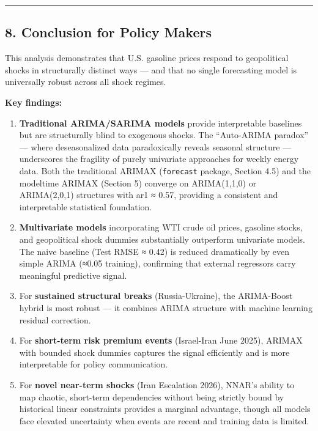 \documentclass[
]{article}
\begin{document}
\begin{center}\rule{0.5\linewidth}{0.5pt}\end{center}

\subsection{8. Conclusion for Policy
Makers}\label{conclusion-for-policy-makers}

This analysis demonstrates that U.S. gasoline prices respond to
geopolitical shocks in structurally distinct ways --- and that no single
forecasting model is universally robust across all shock regimes.

\textbf{Key findings:}

\begin{enumerate}
\def\labelenumi{\arabic{enumi}.}
\item
  \textbf{Traditional ARIMA/SARIMA models} provide interpretable
  baselines but are structurally blind to exogenous shocks. The
  ``Auto-ARIMA paradox'' --- where deseasonalized data paradoxically
  reveals seasonal structure --- underscores the fragility of purely
  univariate approaches for weekly energy data. Both the traditional
  ARIMAX (\texttt{forecast} package, Section 4.5) and the modeltime
  ARIMAX (Section 5) converge on ARIMA(1,1,0) or ARIMA(2,0,1) structures
  with ar1 ≈ 0.57, providing a consistent and interpretable statistical
  foundation.
\item
  \textbf{Multivariate models} incorporating WTI crude oil prices,
  gasoline stocks, and geopolitical shock dummies substantially
  outperform univariate models. The naive baseline (Test RMSE ≈ 0.42) is
  reduced dramatically by even simple ARIMA (≈0.05 training), confirming
  that external regressors carry meaningful predictive signal.
\item
  For \textbf{sustained structural breaks} (Russia-Ukraine), the
  ARIMA-Boost hybrid is most robust --- it combines ARIMA structure with
  machine learning residual correction.
\item
  For \textbf{short-term risk premium events} (Israel-Iran June 2025),
  ARIMAX with bounded shock dummies captures the signal efficiently and
  is more interpretable for policy communication.
\item
  For \textbf{novel near-term shocks} (Iran Escalation 2026), NNAR's
  ability to map chaotic, short-term dependencies without being strictly
  bound by historical linear constraints provides a marginal advantage,
  though all models face elevated uncertainty when events are recent and
  training data is limited.
\end{enumerate}
\end{document}
